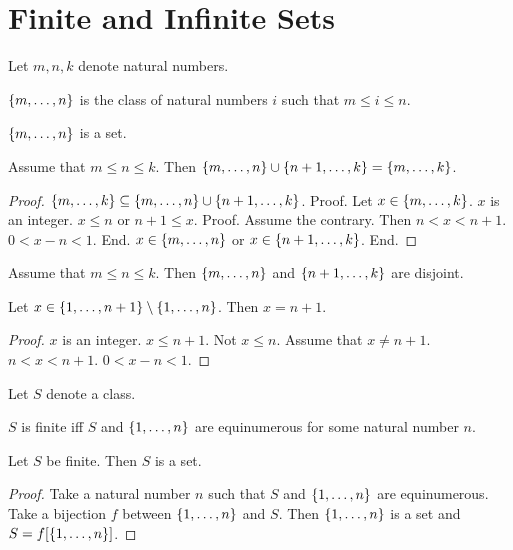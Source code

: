 \documentclass{article}
\begin{document}
  \section{Finite and Infinite Sets}

  \begin{forthel}
  Let $m,n,k$ denote natural numbers.

  \begin{definition}
  $\{m,\dots,n\}$ is the class of
  natural numbers $i$ such that $m \leq i \leq n$.
  \end{definition}

  \begin{lemma}
  $\{m,\dots,n\}$ is a set.
  \end{lemma}

  \begin{lemma}
  Assume that $m \leq n \leq k$.
  Then $\{m,\dots,n\} \cup \{n+1,\dots,k\} = \{m,\dots,k\}$.
  \end{lemma}
  \begin{proof}
  $\{m,\dots,k\} \subseteq \{m,\dots,n\} \cup \{n+1,\dots,k\}$.
  Proof.
  Let $x \in \{m,\dots,k\}$. $x$ is an integer.
  $x \leq n$ or $n+1 \leq x$. Proof. Assume the contrary. Then $n < x < n+1$. $0 < x - n < 1$. End.
  $x \in \{m,\dots,n\}$ or $x \in \{n+1,\dots,k\}$. End.
  \end{proof}


  \begin{lemma} Assume that $m \leq n \leq k$.
  Then $\{m,\dots,n\}$ and $\{n+1,\dots,k\}$ are disjoint.
  \end{lemma}

  \begin{lemma} Let $x \in \{1,\dots,n+1\} \setminus \{1,\dots,n\}$.
  Then $x = n+1$.
  \end{lemma}
  \begin{proof}
  $x$ is an integer.
  $x \leq n+1$. Not $x \leq n$.
  Assume that $x \neq n+1$.
  $n < x < n+1$.
  $0 < x - n < 1$.
  \end{proof}

  Let $S$ denote a class.

  \begin{definition}
  $S$ is finite iff $S$ and $\{1,\dots,n\}$ are equinumerous for some
  natural number $n$.
  \end{definition}

  \begin{lemma}
  Let $S$ be finite. Then $S$ is a set.
  \end{lemma}
  \begin{proof}
  Take a natural number $n$ such that $S$ and $\{1,\dots,n\}$ are equinumerous.
  Take a bijection $f$ between $\{1,\dots,n\}$ and $S$.
  Then $\{1,\dots,n\}$ is a set and $S = f[\{1,\dots,n\}]$.
  \end{proof}
  \end{forthel}
\end{document}
